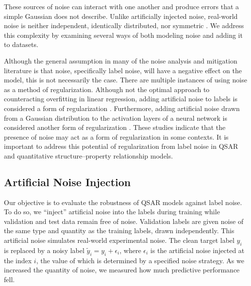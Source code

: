 These sources of noise can interact with one another and produce errors that a simple Gaussian does not describe. Unlike artificially injected noise, real-world noise is neither independent, identically distributed, nor symmetric \citep{Heid2023}. We address this complexity by examining several ways of both modeling noise and adding it to datasets.

Although the general assumption in many of the noise analysis and mitigation literature is that noise, specifically label noise, will have a negative effect on the model, this is not necessarily the case. There are multiple instances of using noise as a method of regularization. Although not the optimal approach to counteracting overfitting in linear regression, adding artificial noise to labels is considered a form of regularization \citep{Ullah2024}. Furthermore, adding artificial noise drawn from a Gaussian distribution to the activation layers of a neural network is considered another form of regularization \citep{Camuto2021}. These studies indicate that the presence of noise may act as a form of regularization in some contexts. It is important to address this potential of regularization from label noise in QSAR and quantitative structure--property relationship models.

\subsection{Artificial Noise Injection}\label{sec:noise_injection}

Our objective is to evaluate the robustness of QSAR models against label noise. To do so, we ``inject'' artificial noise into the labels during training while validation and test data remain free of noise. Validation labels are given noise of the same type and quantity as the training labels, drawn independently. This artificial noise simulates real-world experimental noise. The clean target label $y_i$ is replaced by a noisy label $\tilde{y}_i = y_i + \epsilon_i$, where $\epsilon_i$ is the artificial noise injected at the index $i$, the value of which is determined by a specified noise strategy. As we increased the quantity of noise, we measured how much predictive performance fell. 

